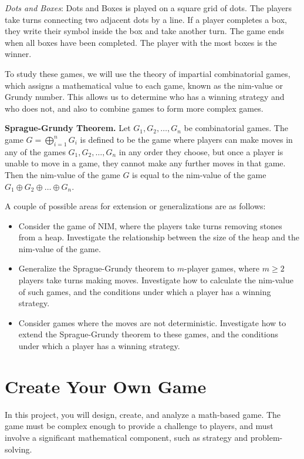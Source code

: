 \documentclass{article}
\begin{document}
\vspace{3mm}
\textit{Dots and Boxes}: Dots and Boxes is played on a square grid of dots. The players take turns connecting two adjacent dots by a line. If a player completes a box, they write their symbol inside the box and take another turn. The game ends when all boxes have been completed. The player with the most boxes is the winner.

\vspace{3mm}
To study these games, we will use the theory of impartial combinatorial games, which assigns a mathematical value to each game, known as the nim-value or Grundy number. This allows us to determine who has a winning strategy and who does not, and also to combine games to form more complex games.

\vspace{3mm}
\textbf{Sprague-Grundy Theorem.}
Let $G_1, G_2, \dots, G_n$ be combinatorial games. The game $G = \bigoplus_{i=1}^n G_i$ is defined to be the game where players can make moves in any of the games $G_1, G_2, \dots, G_n$ in any order they choose, but once a player is unable to move in a game, they cannot make any further moves in that game. Then the nim-value of the game $G$ is equal to the nim-value of the game $G_1 \oplus G_2 \oplus \dots \oplus G_n$.

\vspace{3mm}
A couple of possible areas for extension or generalizations are as follows:
\begin{itemize}
\item Consider the game of NIM, where the players take turns removing stones from a heap. Investigate the relationship between the size of the heap and the nim-value of the game.
\item Generalize the Sprague-Grundy theorem to $m$-player games, where $m \ge 2$ players take turns making moves. Investigate how to calculate the nim-value of such games, and the conditions under which a player has a winning strategy.
\item Consider games where the moves are not deterministic. Investigate how to extend the Sprague-Grundy theorem to these games, and the conditions under which a player has a winning strategy.
\end{itemize}

\pagebreak
\section{Create Your Own Game}
In this project, you will design, create, and analyze a math-based game. The game must be complex enough to provide a challenge to players, and must involve a significant mathematical component, such as strategy and problem-solving.
\end{document}
